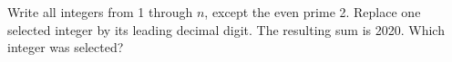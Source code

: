 Write all integers from 1 through $n$, except the even prime 2. Replace one selected integer by its leading decimal digit. The resulting sum is 2020. Which integer was selected?
